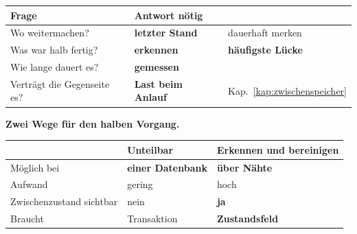 \begin{merksatz}
\begin{center}
{\small
\renewcommand{\arraystretch}{1.5}
\begin{tabular}{@{}P{3.0cm}P{2.4cm}P{2.6cm}@{}}
\toprule
\textbf{Frage} & \textbf{Antwort nötig} & \\
\midrule
Wo weitermachen? & \textbf{letzter Stand} & \textcolor{gruen}{dauerhaft merken}\\
Was war halb fertig? & \textbf{erkennen} & \textcolor{akzent}{\textbf{häufigste Lücke}}\\
Wie lange dauert es? & \textbf{gemessen} & \\
Verträgt die Gegenseite es? & \textbf{Last beim Anlauf} & \textcolor{akzent}{Kap.~\ref{kap:zwischenspeicher}}\\
\bottomrule
\end{tabular}}
\end{center}

\begin{center}
\begin{minipage}{0.88\textwidth}
\end{minipage}
\end{center}

\textbf{Zwei Wege für den halben Vorgang.}

\begin{center}
\renewcommand{\arraystretch}{1.5}
\begin{tabular}{@{}P{3.0cm}P{2.4cm}P{2.8cm}@{}}
\toprule
& \textbf{Unteilbar} & \textbf{Erkennen und bereinigen}\\
\midrule
Möglich bei & \textbf{einer Datenbank} & \textbf{über Nähte}\\
Aufwand & \textcolor{gruen}{gering} & \textcolor{akzent}{hoch}\\
Zwischenzustand sicht\-bar & \textcolor{gruen}{nein} & \textcolor{akzent}{\textbf{ja}}\\
Braucht & Transaktion & \textbf{Zustandsfeld}\\
\bottomrule
\end{tabular}
\end{center}

\begin{center}
\end{center}


\end{merksatz}
